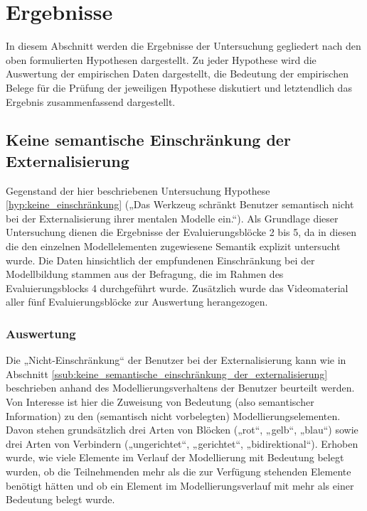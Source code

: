 
\section{Ergebnisse} %
\label{sec:m_ergebnisse}

In diesem Abschnitt werden die Ergebnisse der Untersuchung gegliedert nach den oben formulierten Hypothesen dargestellt. Zu jeder Hypothese wird die Auswertung der empirischen Daten dargestellt, die Bedeutung der empirischen Belege für die Prüfung der jeweiligen Hypothese diskutiert und letztendlich das Ergebnis zusammenfassend dargestellt.  

\subsection{Keine semantische Einschränkung der Externalisierung} %
\label{sub:keine_semantische_einschränkung_der_externalisierung}

Gegenstand der hier beschriebenen Untersuchung Hypothese \ref{hyp:keine_einschränkung} („Das Werkzeug schränkt Benutzer semantisch nicht bei der Externalisierung ihrer mentalen Modelle ein.“). Als Grundlage dieser Untersuchung dienen die Ergebnisse der Evaluierungsblöcke 2 bis 5, da in diesen die den einzelnen Modellelementen zugewiesene Semantik explizit untersucht wurde. Die Daten hinsichtlich der empfundenen Einschränkung bei der Modellbildung stammen aus der Befragung, die im Rahmen des Evaluierungsblocks 4 durchgeführt wurde. Zusätzlich wurde das Videomaterial aller fünf Evaluierungsblöcke zur Auswertung herangezogen.

\subsubsection{Auswertung} %

Die „Nicht-Einschränkung“ der Benutzer bei der Externalisierung kann wie in Abschnitt \ref{ssub:keine_semantische_einschränkung_der_externalisierung} beschrieben anhand des Modellierungsverhaltens der Benutzer beurteilt werden. Von Interesse ist hier die Zuweisung von Bedeutung (also semantischer Information) zu den (semantisch nicht vorbelegten) Modellierungselementen. Davon stehen grundsätzlich drei Arten von Blöcken („rot“, „gelb“, „blau“) sowie drei Arten von Verbindern („ungerichtet“, „gerichtet“, „bidirektional“). Erhoben wurde, wie viele Elemente im Verlauf der Modellierung mit Bedeutung belegt wurden, ob die Teilnehmenden mehr als die zur Verfügung stehenden Elemente benötigt hätten und ob ein Element im Modellierungsverlauf mit mehr als einer Bedeutung belegt wurde. 

